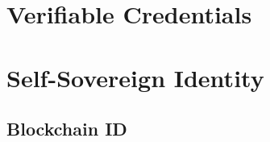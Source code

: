 \hypertarget{verifiable-credentials}{%
\section{Verifiable Credentials}\label{verifiable-credentials}}

\hypertarget{self-sovereign-identity}{%
\section{Self-Sovereign Identity}\label{self-sovereign-identity}}

\hypertarget{blockchain-id}{%
\subsection{Blockchain ID}\label{blockchain-id}}
